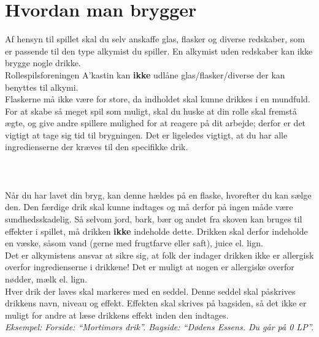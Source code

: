 \section{Hvordan man brygger}
Af hensyn til spillet skal du selv anskaffe glas, flasker og diverse redskaber, som er passende til den type alkymist du spiller. En alkymist uden redskaber kan ikke brygge nogle drikke.\\
Rollespilsforeningen A’kastin kan \textbf{ikke} udlåne glas/flasker/diverse der kan benyttes til alkymi.\\
Flaskerne må ikke være for store, da indholdet skal kunne drikkes i en mundfuld.\\
For at skabe så meget spil som muligt, skal du huske at din rolle skal fremstå ægte, og give andre spillere mulighed for at reagere på dit arbejde; derfor er det vigtigt at tage sig tid til brygningen. Det er ligeledes vigtigt, at du har alle ingredienserne der kræves til den specifikke drik.\\
\\\\\\
Når du har lavet din bryg, kan denne hældes på en flaske, hvorefter du kan sælge den. Den færdige drik skal kunne indtages og må derfor på ingen måde være sundhedsskadelig. Så selvom jord, bark, bær og andet fra skoven kan bruges til effekter i spillet, må drikken \textbf{ikke} indeholde dette. Drikken skal derfor indeholde en væske, såsom vand (gerne med frugtfarve eller saft), juice el. lign.\\
Det er alkymistens ansvar at sikre sig, at folk der indager drikken ikke er allergisk overfor ingredienserne i drikkene! Det er muligt at nogen er allergiske overfor nødder, mælk el. lign.\\
Hver drik der laves skal markeres med en seddel. Denne seddel skal påskrives drikkens navn, niveau og effekt. Effekten skal skrives på bagsiden, så det ikke er muligt for andre at læse drikkens effekt inden den indtages.\\

\emph{Eksempel: Forside: “Mortimors drik”. Bagside: “Dødens Essens. Du går på 0 LP”.}

